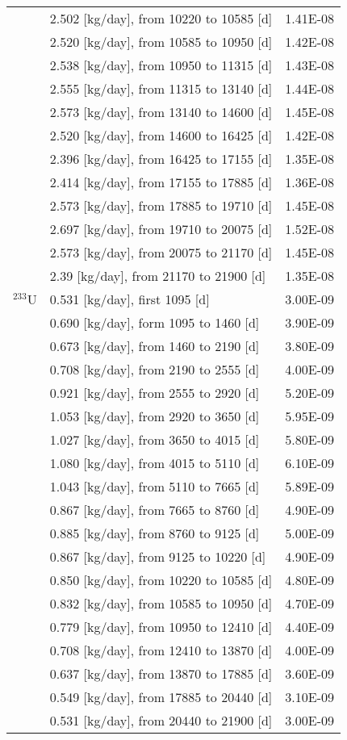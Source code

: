 \begin{longtable}{|p{}|p{}|p{}|}
	& 2.502  [kg/day], from 10220 to 10585 [d]&		1.41E-08	 \\
	& 2.520  [kg/day], from 10585 to 10950 [d]&		1.42E-08	 \\
	&  2.538  [kg/day], from 10950 to 11315 [d]&		1.43E-08	 \\
	&  2.555  [kg/day], from 11315 to 13140 [d]&		1.44E-08	 \\
	&  2.573  [kg/day], from 13140 to 14600 [d]&		1.45E-08	 \\
	&  2.520  [kg/day], from 14600 to 16425 [d]&		1.42E-08	 \\
	& 2.396  [kg/day], from 16425 to 17155 [d]&		1.35E-08	 \\
	&  2.414 [kg/day], from 17155 to 17885 [d]&		1.36E-08	 \\
	& 2.573 [kg/day], from 17885 to 19710 [d]&		1.45E-08	 \\
	&  2.697 [kg/day], from 19710 to 20075 [d]&		1.52E-08	 \\
	&  2.573 [kg/day], from 20075 to 21170 [d]&		1.45E-08	 \\
	&  2.39 [kg/day], from 21170 to 21900 [d]&		1.35E-08	 \\
	\hline
	$^{233}$U &  0.531 [kg/day], first 1095 [d]	&   3.00E-09  \\
	&  0.690 [kg/day], form 1095 to 1460 [d] &	3.90E-09 \\
	& 0.673 [kg/day], from 1460 to 2190 [d] &	3.80E-09 \\
	& 0.708  [kg/day], from 2190 to 2555 [d] &	4.00E-09 \\
	& 0.921  [kg/day], from 2555 to 2920 [d] &	5.20E-09 \\
	&   1.053  [kg/day], from 2920 to 3650 [d] &	5.95E-09 \\
	&  1.027 [kg/day], from 3650 to 4015 [d] &	5.80E-09 \\
	&  1.080  [kg/day], from 4015 to 5110 [d] &	6.10E-09 \\
	&  1.043  [kg/day], from 5110 to 7665 [d] &	5.89E-09 \\
	&  0.867  [kg/day], from 7665 to 8760 [d] &	4.90E-09 \\
	&  0.885  [kg/day], from 8760 to 9125 [d] &	5.00E-09 \\
	&  0.867  [kg/day], from 9125 to 10220 [d] &	4.90E-09 \\
	&  0.850 [kg/day], from 10220 to 10585 [d] &	4.80E-09 \\
	& 0.832  [kg/day], from 10585 to 10950 [d] &	4.70E-09 \\
	& 0.779   [kg/day], from 10950 to 12410 [d] &	4.40E-09 \\
	& 0.708  [kg/day], from 12410 to 13870 [d] &	4.00E-09 \\
	&  0.637  [kg/day], from 13870 to 17885 [d] &	3.60E-09 \\
	&  0.549  [kg/day], from 17885 to 20440 [d] &	3.10E-09 \\
	& 0.531 [kg/day], from 20440 to 21900 [d] &	3.00E-09 \\
	\hline
	
\end{longtable}	
